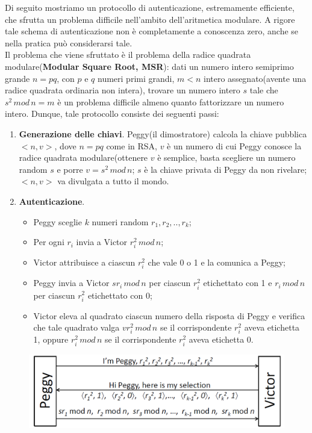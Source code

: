 Di seguito mostriamo un protocollo di autenticazione, estremamente efficiente, che sfrutta un problema difficile nell'ambito dell'aritmetica modulare. A rigore tale schema di autenticazione non è
completamente a conoscenza zero, anche se nella pratica può considerarsi tale. \\
Il problema che viene sfruttato è il problema della radice quadrata modulare(\textbf{Modular Square Root, MSR}): dati un numero intero semiprimo grande $n=pq$, con $p$ e $q$ numeri primi grandi, $m<n$ intero assegnato(avente una radice quadrata ordinaria non intera), trovare un numero intero $s$ tale che $s^2 \, mod \, n=m$ è un problema difficile almeno quanto fattorizzare un numero intero.
Dunque, tale protocollo consiste dei seguenti passi: \begin{enumerate}
\item \textbf{Generazione delle chiavi}. Peggy(il dimostratore) calcola la chiave pubblica $<n,v>$, dove $n=pq$ come in RSA, $v$ è un numero di cui Peggy conosce la radice quadrata modulare(ottenere $v$ è semplice, basta scegliere un numero random $s$ e porre $v = s^2 \, mod \, n$; $s$ è la chiave privata di Peggy da non rivelare; $<n,v>$ va divulgata a tutto il mondo.
\item \textbf{Autenticazione}. \begin{itemize}
\item Peggy sceglie $k$ numeri random $r_{1},r_{2},..,r_{k}$;
\item Per ogni $r_{i}$ invia a Victor $r_{i}^2 \, mod \, n$;
\item Victor attribuisce a ciascun $r_{i}^2$ che vale 0 o 1 e la comunica a Peggy;
\item Peggy invia a Victor $sr_{i} \, mod \, n$ per ciascun $r_{i}^2$ etichettato con 1 e $r_{i} \, mod \, n$ per ciascun $r_{i}^2$ etichettato con 0;
\item Victor eleva al quadrato ciascun numero della risposta di Peggy e verifica che tale quadrato valga $vr_{i}^2 \, mod \, n$ se il corrispondente $r_{i}^2$ aveva etichetta 1, oppure $r_{i}^2 \, mod \, n$ se il corrispondente $r_{i}^2$ aveva etichetta 0.
\end{itemize}
\end{enumerate}
\begin{figure}[htbp]
	\centering%
	\subfigure%
	{\includegraphics[scale=0.6, keepaspectratio]{Immagini/chiave_pubblica/zkasmsr_auth.png}}
	\caption{}
\end{figure}

